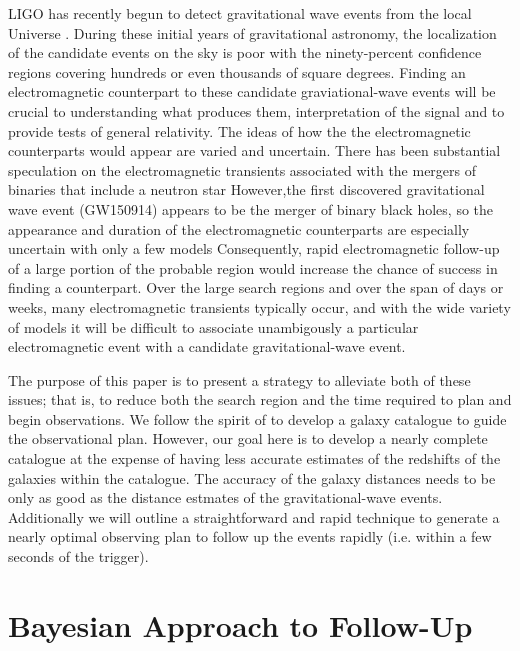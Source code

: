 \documentclass[useAMS,usenatbib]{mn2e}
\begin{document}
LIGO has recently begun to detect gravitational wave events from the
local Universe \citep{PhysRevLett.116.061102}.  During these initial
years of gravitational astronomy, the localization of the candidate
events on the sky is poor with the ninety-percent confidence regions
covering hundreds or even thousands of square degrees.  Finding an
electromagnetic counterpart to these candidate graviational-wave
events will be crucial to understanding what produces them,
interpretation of the signal and to provide tests of general
relativity.  The ideas of how the the electromagnetic counterparts
would appear are varied and uncertain. There has been substantial
speculation on the electromagnetic transients associated with the
mergers of binaries that include a neutron star
\citep[e.g.][]{2016PhRvD..93b4011E,2016arXiv160107711K,2016arXiv160100017D,2015arXiv151205435F,2015ApJ...814L..20M,2015PhRvD..92d4028K,2015arXiv150807939S,2015arXiv150807911S}
However,the first discovered gravitational wave event (GW150914)
appears to be the merger of binary black holes, so the appearance and
duration of the electromagnetic counterparts are especially uncertain
with only a few models
\citep[e.g.][]{2015PhRvL.115n1102G,2015MNRAS.452.3419M,2016MNRAS.457..939C,2016ApJ...817..183Y}
Consequently, rapid electromagnetic follow-up of a large portion of
the probable region would increase the chance of success in finding a
counterpart.  Over the large search regions and over the span of days
or weeks, many electromagnetic transients typically occur, and with
the wide variety of models it will be difficult to associate
unambigously a particular electromagnetic event with a candidate
gravitational-wave event.

The purpose of this paper is to present a strategy to alleviate both
of these issues; that is, to reduce both the search region and the
time required to plan and begin observations.  We follow the spirit of
\citet{2015arXiv150803608G} to develop a galaxy catalogue to guide the
observational plan.  However, our goal here is to develop a nearly
complete catalogue at the expense of having less accurate estimates of
the redshifts of the galaxies within the catalogue.  The accuracy of
the galaxy distances needs to be only as good as the distance estmates
of the gravitational-wave events.  Additionally we will outline a
straightforward and rapid technique to generate a nearly optimal
observing plan to follow up the events rapidly (i.e. within a few
seconds of the trigger). 

\section{Bayesian Approach to Follow-Up}
\end{document}

